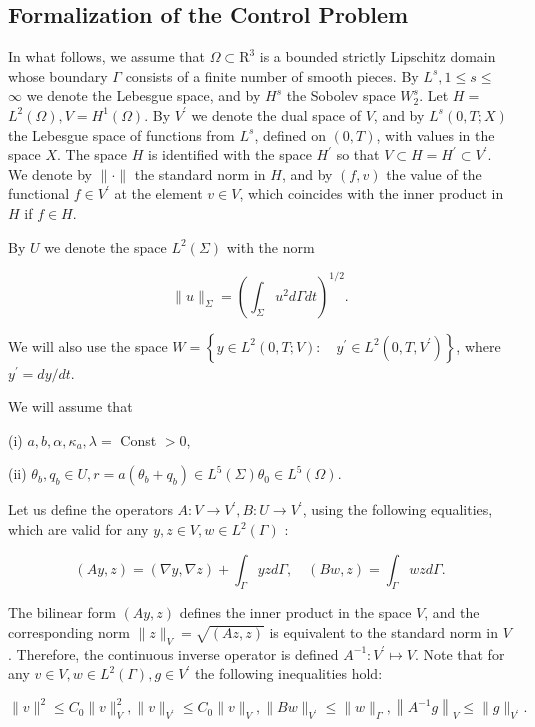 \subsection{Formalization of the Control Problem}
In what follows, we assume that $\Omega \subset \mathrm{R}^{3}$ is a bounded strictly Lipschitz domain whose boundary $\Gamma$ consists of a finite number of smooth pieces. By $L^{s}, 1 \leq s \leq$ $\infty$ we denote the Lebesgue space, and by $H^{s}$ the Sobolev space $W_{2}^{s}$. Let $H=$ $L^{2}(\Omega), V=H^{1}(\Omega)$. By $V^{\prime}$ we denote the dual space of $V$, and by $L^{s}(0, T ; X)$ the Lebesgue space of functions from $L^{s}$, defined on $(0, T)$, with values in the space $X$. The space $H$ is identified with the space $H^{\prime}$ so that $V \subset H=H^{\prime} \subset V^{\prime}$. We denote by $\|\cdot\|$ the standard norm in $H$, and by $(f, v)$ the value of the functional $f \in V^{\prime}$ at the element $v \in V$, which coincides with the inner product in $H$ if $f \in H$.

By $U$ we denote the space $L^{2}(\Sigma)$ with the norm

$$
\|u\|_{\Sigma}=\left(\int_{\Sigma} u^{2} d \Gamma d t\right)^{1 / 2} .
$$

We will also use the space $W=\left\{y \in L^{2}(0, T ; V): \quad y^{\prime} \in L^{2}\left(0, T, V^{\prime}\right)\right\}$, where $y^{\prime}=d y / d t$.

We will assume that

(i) $a, b, \alpha, \kappa_{a}, \lambda=$ Const $>0$,

(ii) $\theta_{b}, q_{b} \in U, r=a\left(\theta_{b}+q_{b}\right) \in L^{5}(\Sigma) \theta_{0} \in L^{5}(\Omega)$.

Let us define the operators $A: V \rightarrow V^{\prime}, B: U \rightarrow V^{\prime}$, using the following equalities, which are valid for any $y, z \in V, w \in L^{2}(\Gamma)$ :

$$
(A y, z)=(\nabla y, \nabla z)+\int_{\Gamma} y z d \Gamma, \quad(B w, z)=\int_{\Gamma} w z d \Gamma .
$$

The bilinear form $(A y, z)$ defines the inner product in the space $V$, and the corresponding norm $\|z\|_{V}=\sqrt{(A z, z)}$ is equivalent to the standard norm in $V$. Therefore, the continuous inverse operator is defined $A^{-1}: V^{\prime} \mapsto V$. Note that for any $v \in V, w \in L^{2}(\Gamma), g \in V^{\prime}$ the following inequalities hold:

$$
\|v\|^{2} \leq C_{0}\|v\|_{V}^{2},\|v\|_{V^{\prime}} \leq C_{0}\|v\|_{V},\|B w\|_{V^{\prime}} \leq\|w\|_{\Gamma},\left\|A^{-1} g\right\|_{V} \leq\|g\|_{V^{\prime}} .
$$

